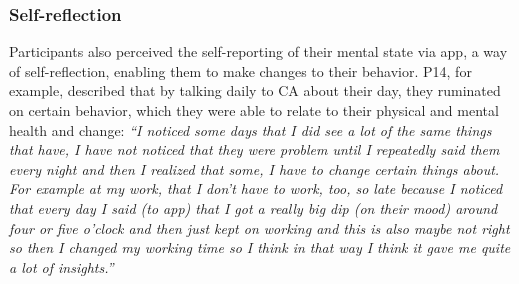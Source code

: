     \subsubsection{Self-reflection}
    Participants also perceived the self-reporting of their mental state via \acl{app}, a way of self-reflection, enabling them to make changes to their behavior. 
    P14, for example, described that by talking daily to \ac{CA} about their day, they ruminated on certain behavior, which they were able to relate to their physical and mental health and change:
            \textit{``I noticed some days that I did see a lot of the same things that have, I have not noticed that they were problem until I repeatedly said them every night and then I realized that some, I have to change certain things about. For example at my work, that I don't have to work, too, so late because I noticed that every day I said (to \acl{app}) that I got a really big dip (on their mood) around four or five o'clock and then just kept on working and this is also maybe not right so then I changed my working time so I think in that way I think it gave me quite a lot of insights.''
            }
